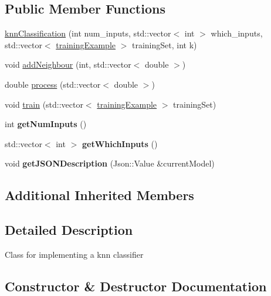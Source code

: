 \subsection*{Public Member Functions}
\begin{DoxyCompactItemize}
\item 
\hyperlink{classknn_classification_a93e0eda34ff02a37baaa8700b46ec5fd}{knn\+Classification} (int num\+\_\+inputs, std\+::vector$<$ int $>$ which\+\_\+inputs, std\+::vector$<$ \hyperlink{structtraining_example}{training\+Example} $>$ training\+Set, int k)
\item 
void \hyperlink{classknn_classification_a591f953b182fed995ebfb13c712b76d5}{add\+Neighbour} (int, std\+::vector$<$ double $>$)
\item 
double \hyperlink{classknn_classification_a909050a125c4bf5cc2e48db0202fcb79}{process} (std\+::vector$<$ double $>$)
\item 
void \hyperlink{classknn_classification_ae159e53f542d08d04c76760f2e25e843}{train} (std\+::vector$<$ \hyperlink{structtraining_example}{training\+Example} $>$ training\+Set)
\item 
\mbox{\label{classknn_classification_a3f9c8fb78c6a66f0ab9440629140400d}} 
int {\bfseries get\+Num\+Inputs} ()
\item 
\mbox{\label{classknn_classification_af7db9297f695e67df6af08719da37921}} 
std\+::vector$<$ int $>$ {\bfseries get\+Which\+Inputs} ()
\item 
\mbox{\label{classknn_classification_a456b4b1b0fedb8f8fbe6d810bd80ceb8}} 
void {\bfseries get\+J\+S\+O\+N\+Description} (Json\+::\+Value \&current\+Model)
\end{DoxyCompactItemize}
\subsection*{Additional Inherited Members}


\subsection{Detailed Description}
Class for implementing a knn classifier 

\subsection{Constructor \& Destructor Documentation}
\mbox{\label{classknn_classification_a93e0eda34ff02a37baaa8700b46ec5fd}} 
